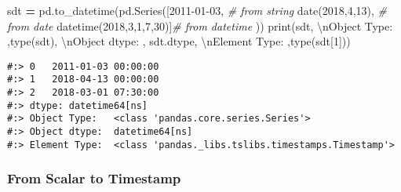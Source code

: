 \documentclass[
]{book}
\newenvironment{Shaded}{\begin{snugshade}}{\end{snugshade}}
\newcommand{\BuiltInTok}[1]{#1}
\newcommand{\CharTok}[1]{\textcolor[rgb]{0.5,0.5,0.5}{#1}}
\newcommand{\CommentTok}[1]{\textcolor[rgb]{0.37,0.37,0.37}{\textit{#1}}}
\newcommand{\DecValTok}[1]{\textcolor[rgb]{0.06,0.06,0.06}{#1}}
\newcommand{\NormalTok}[1]{#1}
\newcommand{\OperatorTok}[1]{\textcolor[rgb]{0.43,0.43,0.43}{\textbf{#1}}}
\newcommand{\StringTok}[1]{\textcolor[rgb]{0.5,0.5,0.5}{#1}}
\begin{document}
\begin{Shaded}
\begin{Highlighting}[]
\NormalTok{sdt }\OperatorTok{=}\NormalTok{ pd.to\_datetime(pd.Series([}\StringTok{\textquotesingle{}2011{-}01{-}03\textquotesingle{}}\NormalTok{,      }\CommentTok{\# from string}
\NormalTok{                                date(}\DecValTok{2018}\NormalTok{,}\DecValTok{4}\NormalTok{,}\DecValTok{13}\NormalTok{),        }\CommentTok{\# from date}
\NormalTok{                                datetime(}\DecValTok{2018}\NormalTok{,}\DecValTok{3}\NormalTok{,}\DecValTok{1}\NormalTok{,}\DecValTok{7}\NormalTok{,}\DecValTok{30}\NormalTok{)]}\CommentTok{\# from datetime}
\NormalTok{              ))}
\BuiltInTok{print}\NormalTok{(sdt,}
      \StringTok{\textquotesingle{}}\CharTok{\textbackslash{}n}\StringTok{Object Type:  \textquotesingle{}}\NormalTok{,}\BuiltInTok{type}\NormalTok{(sdt),}
      \StringTok{\textquotesingle{}}\CharTok{\textbackslash{}n}\StringTok{Object dtype: \textquotesingle{}}\NormalTok{, sdt.dtype,}
      \StringTok{\textquotesingle{}}\CharTok{\textbackslash{}n}\StringTok{Element Type: \textquotesingle{}}\NormalTok{,}\BuiltInTok{type}\NormalTok{(sdt[}\DecValTok{1}\NormalTok{]))}
\end{Highlighting}
\end{Shaded}

\begin{verbatim}
#:> 0   2011-01-03 00:00:00
#:> 1   2018-04-13 00:00:00
#:> 2   2018-03-01 07:30:00
#:> dtype: datetime64[ns] 
#:> Object Type:   <class 'pandas.core.series.Series'> 
#:> Object dtype:  datetime64[ns] 
#:> Element Type:  <class 'pandas._libs.tslibs.timestamps.Timestamp'>
\end{verbatim}

\hypertarget{from-scalar-to-timestamp}{%
\subsubsection{From Scalar to Timestamp}\label{from-scalar-to-timestamp}}
\end{document}
